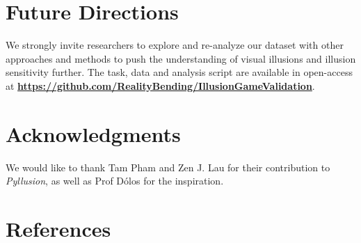 \documentclass[
  man,floatsintext]{apa6}
\begin{document}
\hypertarget{future-directions}{%
\section{Future Directions}\label{future-directions}}

We strongly invite researchers to explore and re-analyze our dataset with other approaches and methods to push the understanding of visual illusions and illusion sensitivity further. The task, data and analysis script are available in open-access at \href{https://github.com/RealityBending/IllusionGameValidation}{\textbf{https://github.com/RealityBending/IllusionGameValidation}}.

\hypertarget{acknowledgments}{%
\section{Acknowledgments}\label{acknowledgments}}

We would like to thank Tam Pham and Zen J. Lau for their contribution to \emph{Pyllusion}, as well as Prof Dólos for the inspiration.

\newpage

\hypertarget{references}{%
\section{References}\label{references}}
\end{document}
